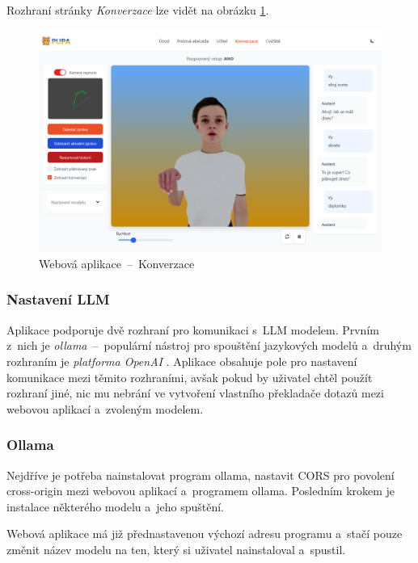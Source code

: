 \documentclass[
  master,
  program=ainfvs,
  biblatex,
  figures=true,
  tables=false,
  sourcecodes=true,
  glossaries,
  index
]{kidiplom}
\begin{document}
        Rozhraní stránky \emph{Konverzace} lze vidět na obrázku \ref{konverzace}.

         \begin{figure}[htbp]
                \centering
                \includegraphics[width=1\columnwidth]{graphics/konverzace.png}
                \caption{Webová aplikace~--~Konverzace}
                \label{konverzace}
            \end{figure}

        \subsubsection{Nastavení LLM}
            Aplikace podporuje dvě rozhraní pro komunikaci s~LLM modelem. Prvním z~nich je \emph{ollama}~--~populární nástroj pro spouštění jazykových modelů \cite{ollama} a~druhým rozhraním je \emph{platforma OpenAI} \cite{open-ai}. Aplikace obsahuje pole pro nastavení komunikace mezi těmito rozhraními, avšak pokud by uživatel chtěl použít rozhraní jiné, nic mu nebrání ve vytvoření vlastního překladače dotazů mezi webovou aplikací a~zvoleným modelem.
        
        \subsubsection{Ollama}
                Nejdříve je potřeba nainstalovat program ollama, nastavit CORS pro povolení cross-origin mezi webovou aplikací a~programem ollama. Posledním krokem je instalace některého modelu a~jeho spuštění.
                
                Webová aplikace má již přednastavenou výchozí adresu programu a~stačí pouze změnit název modelu na ten, který si uživatel nainstaloval a~spustil.
\end{document}
